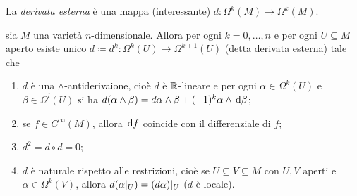 La \emph{derivata esterna} è una mappa (interessante) $d:\Omega^k(M) \to \Omega^k(M)$. %

\begin{theorem}
	sia $M$ una varietà $n$-dimensionale. Allora per ogni $k=0,\ldots,n$ e per ogni $U\subseteq M$ aperto esiste unico $d \coloneqq d^k : \Omega^k(U) \to \Omega^{k+1}(U)$ (detta derivata esterna) tale che
	\begin{enumerate}
		\item $d$ è una $\wedge$-antiderivaione, cioè $d$ è $\mathbb R$-lineare e per ogni $\alpha\in\Omega^k(U)$ e $\beta\in\Omega^l(U)$ si ha $d(\alpha\wedge\beta) = d\alpha \wedge \beta +(-1)^k \alpha\wedge \,\mathrm d \beta$;
		\item se $f\in C^\infty(M)$, allora $\,\mathrm d f$ coincide con il differenziale di $f$;
		\item $d^2 = d\circ d = 0$;
		\item $d$ è naturale rispetto alle restrizioni, cioè se $U\subseteq V \subseteq M$ con $U,V$ aperti e $\alpha\in\Omega^k(V)$, allora $d(\alpha|_ U) = (d\alpha)|_ U$ ($d$ è locale).
	\end{enumerate}
\end{theorem}
